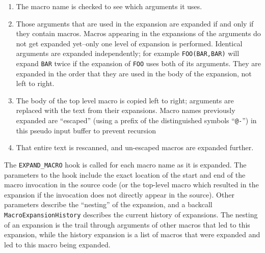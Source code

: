 \documentclass{article}
\begin{document}
\begin{enumerate}
\item The macro name is checked to see which arguments it uses.
\item Those arguments that are used in the expansion are expanded if and
      only if they contain macros.  Macros appearing in the expansions
      of the arguments do not get expanded yet--only one level of
      expansion is performed. Identical arguments are expanded
      independently; for example \texttt{FOO(BAR,BAR)} will expand
      \texttt{BAR} twice if the expansion of \texttt{FOO} uses both of
      its arguments.  They are expanded in the order that they are used
      in the body of the expansion, not left to right.
\item The body of the top level macro is copied left to right; arguments
      are replaced with the text from their expansions.  Macro names
      previously expanded are ``escaped'' (using a prefix of the
      distinguished symbols ``\texttt{@-}'') in this pseudo input buffer
      to prevent recursion
\item That entire text is rescanned, and un-escaped macros are expanded
      further.
\end{enumerate}

\noindent The \texttt{EXPAND\_MACRO} hook is called for each macro name as it is
expanded.  The parameters to the hook include the exact location of the
start and end of the macro invocation in the source code (or the
top-level macro which resulted in the expansion if the invocation does
not directly appear in the source).  Other parameters describe the
``nesting'' of the expansion, and a backcall
\texttt{MacroExpansionHistory} describes the current history of
expansions.  The nesting of an expansion is the trail through arguments
of other macros that led to this expansion, while the history expansion
is a list of macros that were expanded and led to this macro being expanded.
\end{document}
